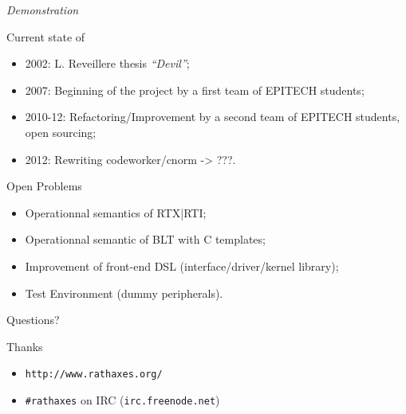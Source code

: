 \documentclass[xcolor={usenames,svgnames}]{beamer}
\begin{document}
\begin{frame}{}%
	\begin{center}
	\Huge{\emph{Demonstration}}
	\end{center}
\end{frame}


\begin{frame}{Current state of \rtx}
        \Large{%
    \begin{center}
        \begin{itemize}
            \item 2002: L. Reveillere thesis \emph{``Devil''};
            \item 2007: Beginning of the project by a first team of EPITECH students;
            \item 2010-12: Refactoring/Improvement by a second team of EPITECH students, open sourcing;
            \item 2012: Rewriting codeworker/cnorm -> ???.
        \end{itemize}
    \end{center}
        }
\end{frame}

\begin{frame}{Open Problems}
    \begin{center}
        \Large{%
	\begin{itemize}
            \item Operationnal semantics of RTX|RTI;
            \item Operationnal semantic of BLT with C templates;
            \item Improvement of front-end DSL (interface/driver/kernel library);
            \item Test Environment (dummy peripherals).
	\end{itemize}
        }
    \end{center}
\end{frame}

\begin{frame}{Questions?}
\begin{center}
\Huge{Thanks}

\end{center}

\vspace{2em}
\begin{itemize}
\item \Large{\texttt{http://www.rathaxes.org/}}
\item \Large{\texttt{\#rathaxes} on IRC (\texttt{irc.freenode.net})}
\end{itemize}
\end{frame}
\end{document}
